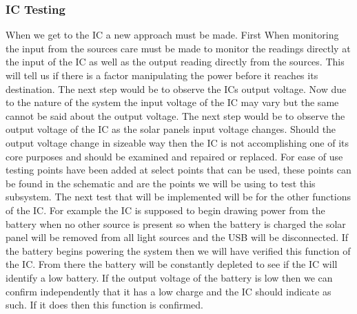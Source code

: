 \subsubsection{IC Testing}
When we get to the IC a new approach must be made. First When monitoring the input from the sources care must be made to monitor the readings directly at the input of the IC as well as the output reading directly from the sources. This will tell us if there is a factor manipulating the power before it reaches its destination. The next step would be to observe the ICs output voltage. Now due to the nature of the system the input voltage of the IC may vary but the same cannot be said about the output voltage. The next step would be to observe the output voltage of the IC as the solar panels input voltage changes. Should the output voltage change in sizeable way then the IC is not accomplishing one of its core purposes and should be examined and repaired or replaced. For ease of use testing points have been added at select points that can be used, these points can be found in the schematic and are the points we will be using to test this subsystem. The next test that will be implemented will be for the other functions of the IC. For example the IC is supposed to begin drawing power from the battery when no other source is present so when the battery is charged the solar panel will be removed from all light sources and the USB will be disconnected. If the battery begins powering the system then we will have verified this function of the IC. From there the battery will be constantly depleted to see if the IC will identify a low battery. If the output voltage of the battery is low then we can confirm independently that it has a low charge and the IC should indicate as such. If it does then this function is confirmed.

